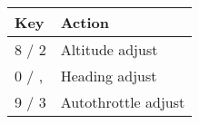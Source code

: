 \begin{tabular}{|l|l|}\hline
 Key           &         Action\\\hline
    8 / 2      &         Altitude adjust\\
    0 / ,      &         Heading adjust\\
    9 / 3      &         Autothrottle adjust \\\hline
 \end{tabular}

